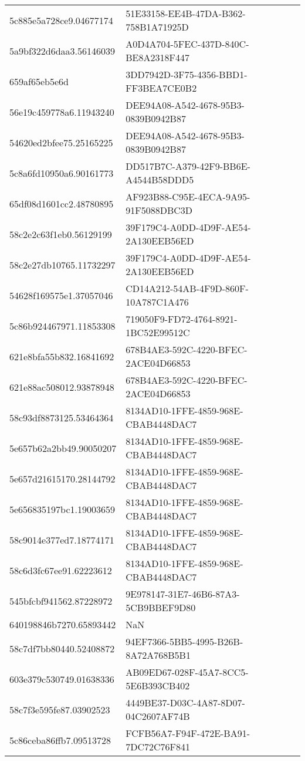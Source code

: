 \begin{tabular}{ll}
5c885e5a728ce9.04677174 & 51E33158-EE4B-47DA-B362-758B1A71925D \\
5a9bf322d6daa3.56146039 & A0D4A704-5FEC-437D-840C-BE8A2318F447 \\
659af65eb5e6d & 3DD7942D-3F75-4356-BBD1-FF3BEA7CE0B2 \\
56e19c459778a6.11943240 & DEE94A08-A542-4678-95B3-0839B0942B87 \\
54620ed2bfee75.25165225 & DEE94A08-A542-4678-95B3-0839B0942B87 \\
5c8a6fd10950a6.90161773 & DD517B7C-A379-42F9-BB6E-A4544B58DDD5 \\
65df08d1601cc2.48780895 & AF923B88-C95E-4ECA-9A95-91F5088DBC3D \\
58c2e2c63f1eb0.56129199 & 39F179C4-A0DD-4D9F-AE54-2A130EEB56ED \\
58c2e27db10765.11732297 & 39F179C4-A0DD-4D9F-AE54-2A130EEB56ED \\
54628f169575e1.37057046 & CD14A212-54AB-4F9D-860F-10A787C1A476 \\
5c86b924467971.11853308 & 719050F9-FD72-4764-8921-1BC52E99512C \\
621e8bfa55b832.16841692 & 678B4AE3-592C-4220-BFEC-2ACE04D66853 \\
621e88ac508012.93878948 & 678B4AE3-592C-4220-BFEC-2ACE04D66853 \\
58c93df8873125.53464364 & 8134AD10-1FFE-4859-968E-CBAB4448DAC7 \\
5e657b62a2bb49.90050207 & 8134AD10-1FFE-4859-968E-CBAB4448DAC7 \\
5e657d21615170.28144792 & 8134AD10-1FFE-4859-968E-CBAB4448DAC7 \\
5e656835197bc1.19003659 & 8134AD10-1FFE-4859-968E-CBAB4448DAC7 \\
58c9014e377ed7.18774171 & 8134AD10-1FFE-4859-968E-CBAB4448DAC7 \\
58c6d3fc67ee91.62223612 & 8134AD10-1FFE-4859-968E-CBAB4448DAC7 \\
545bfcbf941562.87228972 & 9E978147-31E7-46B6-87A3-5CB9BBEF9D80 \\
640198846b7270.65893442 & NaN \\
58c7df7bb80440.52408872 & 94EF7366-5BB5-4995-B26B-8A72A768B5B1 \\
603e379c530749.01638336 & AB09ED67-028F-45A7-8CC5-5E6B393CB402 \\
58c7f3e595fe87.03902523 & 4449BE37-D03C-4A87-8D07-04C2607AF74B \\
5c86ceba86ffb7.09513728 & FCFB56A7-F94F-472E-BA91-7DC72C76F841 \\

\end{tabular}
